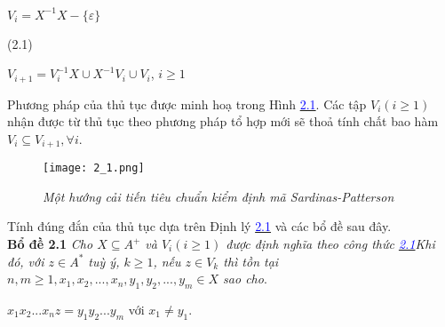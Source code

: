 $V_i = X^{-1}X - \{ \varepsilon \}$ \begin{flushright}
        (2.1)
\end{flushright}
$V_{i+1} = V_i^{-1}X \cup X^{-1}V_i \cup V_i$, $i \ge 1$
\begin{flushleft}
\hspace{10mm}Phương pháp của thủ tục được minh hoạ trong Hình \hyperlink{page.43}{\textcolor{blue}{2.1}}. Các tập $V_i (i \ge 1)$ nhận được từ thủ tục theo phương pháp tổ hợp mới sẽ thoả tính chất bao hàm $V_i \subseteq V_{i+1}, \forall i$.
\end{flushleft}
\begin{figure}[ht]
    \texttt{[image: 2\_1.png]}
    \caption{ \textit{Một hướng cải tiến tiêu chuẩn kiểm định mã Sardinas-Patterson} }
\end{figure}
\begin{flushleft}
\hspace{10mm}Tính đúng đắn của thủ tục dựa trên Định lý \hyperlink{page.43}{\textcolor{blue}{2.1}} và các bổ đề sau đây.\\
\textbf{Bổ đề 2.1}      \textit{Cho $X \subseteq A^+$ và $V_i(i \ge 1)$ được định nghĩa theo công thức \hyperlink{page.42}{\textcolor{blue}{2.1}}Khi đó, với $z \in A^*$ tuỳ ý, $k \ge 1$, nếu $z \in V_k$ thì tồn tại $n,m \ge 1, x_1,x_2,...,x_n, y_1, y_2,...,y_m \in X$ sao cho}.
\end{flushleft}
$x_1x_2...x_n z = y_1y_2...y_m$ với $x_1 \ne y_1$.
